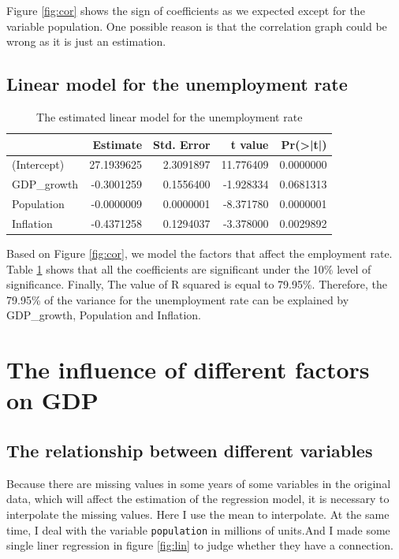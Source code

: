 \documentclass[11pt,a4paper,]{article}
\begin{document}
Figure \ref{fig:cor} shows the sign of coefficients as we expected except for the variable population. One possible reason is that the correlation graph could be wrong as it is just an estimation.

\subsection{Linear model for the unemployment rate}

\begin{table}[H]

\caption{\label{tab:model}The estimated linear model for the unemployment rate}
\centering
\begin{tabular}[t]{lrrrr}
\toprule
  & Estimate & Std. Error & t value & Pr(>|t|)\\
\midrule
(Intercept) & 27.1939625 & 2.3091897 & 11.776409 & 0.0000000\\
GDP\_growth & -0.3001259 & 0.1556400 & -1.928334 & 0.0681313\\
Population & -0.0000009 & 0.0000001 & -8.371780 & 0.0000001\\
Inflation & -0.4371258 & 0.1294037 & -3.378000 & 0.0029892\\
\bottomrule
\end{tabular}
\end{table}

Based on Figure \ref{fig:cor}, we model the factors that affect the employment rate. Table \ref{tab:model} shows that all the coefficients are significant under the 10\% level of significance. Finally, The value of R squared is equal to 79.95\%. Therefore, the 79.95\% of the variance for the unemployment rate can be explained by GDP\_growth, Population and Inflation.

\section{The influence of different factors on GDP}

\subsection{The relationship between  different variables}

Because there are missing values in some years of some variables in the original data, which will affect the estimation of the regression model, it is necessary to interpolate the missing values. Here I use the mean to interpolate. At the same time, I deal with the variable \texttt{population} in millions of units.And I made some single liner regression in figure \ref{fig:lin} to judge whether they have a connection.
\end{document}
